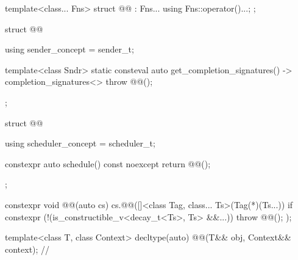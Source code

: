 \pnum
{}
\begin{codeblock}
template<class... Fns>
struct @@ : Fns... {
  using Fns::operator()...;
};
\end{codeblock}

\pnum
{}
\begin{codeblock}
struct @@ {
  using sender_concept = sender_t;

  template<class Sndr>
    static consteval auto get_completion_signatures() -> completion_signatures<> {
      throw @@();
  }
};
\end{codeblock}

\pnum
{}%
%
\begin{codeblock}
struct @@ {
  using scheduler_concept = scheduler_t;

  constexpr auto schedule() const noexcept {
    return @@();
  }
};
\end{codeblock}

\pnum
{}
\begin{codeblock}
constexpr void @@(auto cs) {
  cs.@@([]<class Tag, class... Ts>(Tag(*)(Ts...)) {
    if constexpr (!(is_constructible_v<decay_t<Ts>, Ts> &&...))
      throw @@();
  });
}
\end{codeblock}

\begin{itemdecl}
template<class T, class Context>
  decltype(auto) @@(T&& obj, Context&& context);       // \expos
\end{itemdecl}

